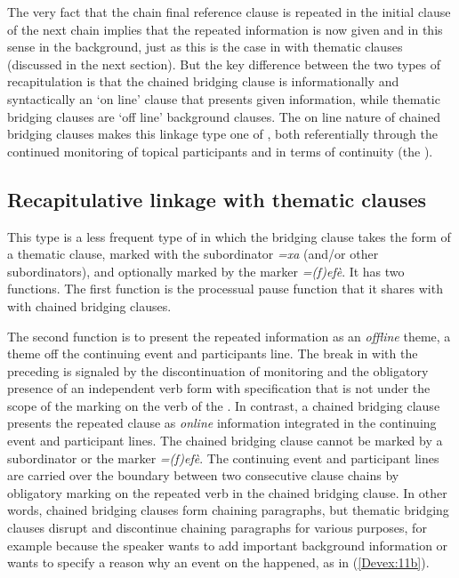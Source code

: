 \documentclass[output=paper]{LSP/langsci}
\begin{document}
The very fact that the chain final reference clause is repeated in the initial clause of the next chain implies that the repeated information is now given and in this sense in the background, just as this is the case in  with thematic clauses (discussed in the next section). But the key difference between the two types of recapitulation is that the chained bridging clause is informationally and syntactically an `on line' clause that presents given information, while thematic bridging clauses are `off line' background clauses. The on line nature of chained bridging clauses makes this linkage type one of , both referentially through the continued  monitoring of topical participants and in terms of   continuity (the ). 
	
	
\subsection{Recapitulative linkage with thematic clauses} 
\label{Devrecap.link.thematic}
This type is a less frequent type of  in which the bridging clause takes the form of a thematic clause, marked with the subordinator \textit{=xa} (and/or other subordinators), and optionally marked by the  marker \textit{=(f)efè}. It has two functions. The first function is the processual pause function that it shares with  with chained bridging clauses.

The second function is to present the repeated information as an \textit{offline} theme, a theme off the continuing event and participants line. The break in  with the preceding  is signaled by the discontinuation of  monitoring and the
obligatory presence of an independent verb form with  specification that is not under the scope of the  marking on the verb of the .  In contrast, a chained bridging clause presents the repeated clause as \textit{online} information integrated in the continuing event and  participant  lines. The chained bridging clause cannot be marked by a subordinator or the  marker \textit{=(f)efè}. The continuing event and participant lines are carried over the boundary  between two consecutive clause chains by obligatory  marking on the repeated verb in the chained bridging clause. In other words, chained bridging clauses form chaining paragraphs,  but thematic  bridging clauses disrupt and discontinue chaining paragraphs for various purposes, for example because the speaker wants to add important background information or wants to specify a reason why an event on the  happened, as in (\ref{Devex:11b}). 
\end{document}
